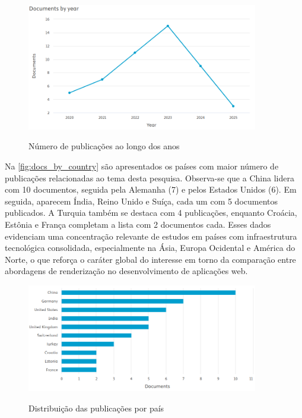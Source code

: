\begin{figure}[H]
    \centering
    \caption{Número de publicações ao longo dos anos}
    \includegraphics[width=0.9\textwidth]{media/docs_by_year.png}
    \label{fig:docs_by_year}
\end{figure}

Na \autoref{fig:docs_by_country} são apresentados os países com maior número de publicações relacionadas ao tema desta pesquisa. Observa-se que a China lidera com 10 documentos, seguida pela Alemanha (7) e pelos Estados Unidos (6). Em seguida, aparecem Índia, Reino Unido e Suíça, cada um com 5 documentos publicados. A Turquia também se destaca com 4 publicações, enquanto Croácia, Estônia e França completam a lista com 2 documentos cada. Esses dados evidenciam uma concentração relevante de estudos em países com infraestrutura tecnológica consolidada, especialmente na Ásia, Europa Ocidental e América do Norte, o que reforça o caráter global do interesse em torno da comparação entre abordagens de renderização no desenvolvimento de aplicações web.

\begin{figure}[H]
    \centering
    \caption{Distribuição das publicações por país}
    \includegraphics[width=0.9\textwidth]{media/docs_by_country.png}
    \label{fig:docs_by_country}
\end{figure}



